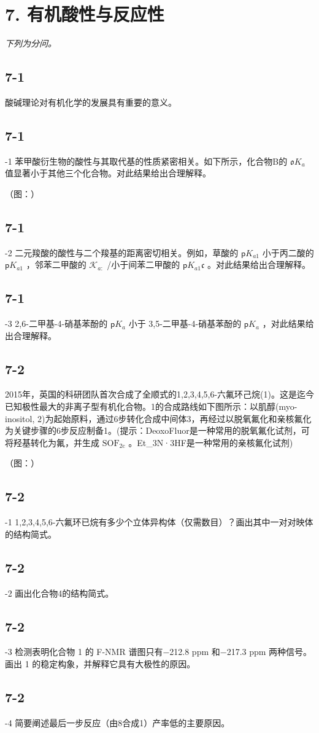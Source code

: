 \section*{7. 有机酸性与反应性}
\textit{下列为分问。}

\subsection*{7-1}
酸碱理论对有机化学的发展具有重要的意义。

\subsection*{7-1}
-1 苯甲酸衍⽣物的酸性与其取代基的性质紧密相关。如下所⽰，化合物B的 ${ \mathfrak { o } } K _ { a }$ 值显著⼩于其他三个化合物。对此结果给出合理解释。

（图：）

\subsection*{7-1}
-2 ⼆元羧酸的酸性与⼆个羧基的距离密切相关。例如，草酸的 $\mathsf { p } K _ { a 1 }$ ⼩于丙⼆酸的 $\mathsf { p } K _ { a 1 }$ ，邻苯⼆甲酸的 $\mathcal { K } _ { a \mathrm { : } }$ /⼩于间苯⼆甲酸的 $\mathsf { p } K _ { a 1 } \mathfrak { c }$ 。对此结果给出合理解释。

\subsection*{7-1}
-3 2,6-⼆甲基-4-硝基苯酚的 $\mathsf { p } K _ { a }$ ⼩于 3,5-⼆甲基-4-硝基苯酚的 $\mathsf { p } K _ { a }$ ，对此结果给出合理解释。

\subsection*{7-2}
2015年，英国的科研团队⾸次合成了全顺式的1,2,3,4,5,6-六氟环⼰烷(1)。这是迄今已知极性最⼤的⾮离⼦型有机化合物。1的合成路线如下图所⽰：以肌醇(myo-inositol, 2)为起始原料，通过6步转化合成中间体3，再经过以脱氧氟化和亲核氟化为关键步骤的6步反应制备1。(提⽰：DeoxoFluor是⼀种常⽤的脱氧氟化试剂，可将羟基转化为氟，并⽣成 $\mathrm { S O F _ { 2 c } }$ 。Et_{3}N·3HF是⼀种常⽤的亲核氟化试剂)

（图：）

\subsection*{7-2}
-1 1,2,3,4,5,6-六氟环已烷有多少个⽴体异构体（仅需数⽬）？画出其中⼀对对映体的结构简式。

\subsection*{7-2}
-2 画出化合物4的结构简式。

\subsection*{7-2}
-3 检测表明化合物 1 的 F-NMR 谱图只有−212.8 ppm 和−217.3 ppm 两种信号。画出 1 的稳定构象，并解释它具有⼤极性的原因。

\subsection*{7-2}
-4 简要阐述最后⼀步反应（由8合成1）产率低的主要原因。

